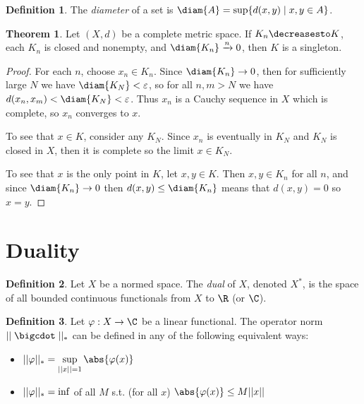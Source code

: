 \documentclass[a5paper]{article}
\theoremstyle{definition}%
\newtheorem*{theorem*}{Theorem} %
\newtheorem*{definition*}{Definition}
\numberwithin{exercise}{section}
\theoremstyle{remark}%
\renewcommand{\epsilon}{\varepsilon}
\begin{document}
\begin{definition*}
The \emph{diameter} of a set is $\diam{A}=\sup \{d(x,y) \mid x,y\in A\}$. 
\end{definition*}

\begin{theorem*}
Let $(X,d)$ be a complete metric space. If $K_n\decreasesto K$, each $K_n$ is closed and nonempty, 
and $\diam{K_n}\xrightarrow{n}0$,  
then $K$ is a singleton.
\end{theorem*}
\begin{proof}
For each $n$, choose $x_n\in K_n$. Since $\diam{K_n}\to 0$, then for sufficiently large $N$ we have $\diam{K_N}<\epsilon$, so for all $n,m>N$ we have $d(x_n,x_m)<\diam{K_N}<\epsilon$. Thus ${x_n}$ is a Cauchy sequence in $X$ which is complete, so ${x_n}$ converges to $x$. 

To see that $x\in K$, consider any $K_N$. Since $x_n$ is eventually in $K_N$ and $K_N$ is closed in $X$, then it is complete so the limit $x\in K_N$. 

To see that $x$ is the only point in $K$, let $x,y\in K$. Then $x,y\in K_n$ for all $n$, and since $\diam{K_n}\to0$ then $d(x,y)\leq \diam{K_n}$ means that $d(x,y)=0$ so $x=y$. 
\end{proof}


\let\oldphi\phi
\renewcommand{\phi}{\varphi}
\section{Duality}
\begin{definition*}
Let $X$ be a normed space. The \emph{dual} of $X$, denoted $X^*$, is the space of all bounded continuous functionals from $X$ to $\R$ (or $\C$).
\end{definition*}

\begin{definition*}
Let $\phi:X\to\C$ be a linear functional. The operator norm $\norm{\;\cdot\;}_*$ can be defined in any of the following equivalent ways:
	\begin{itemize}
	\item $\norm{\phi}_*=\sup\limits_{\norm{x}=1}\abs{\phi(x)}$
	\item $\norm{\phi}_*=\inf$ of all $M$ s.t. (for all $x$) $\abs{\phi(x)}\leq M\norm{x}$
	\end{itemize}
\end{definition*}
\end{document}
